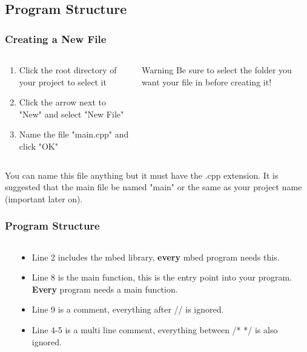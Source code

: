 \subsection{Program Structure}
\label{sub:program_structure}
\begin{frame}
	\frametitle{Creating a New File}
	\begin{columns}[c]
		\begin{column}{0.5\textwidth}
			\begin{enumerate}
				\item Click the root directory of your project to select it
				\item Click the arrow next to "New" and select "New File"
				\item Name the file "main.cpp" and click "OK"
			\end{enumerate}
		\end{column}
		\begin{column}{0.5\textwidth}
			\begin{block}{Warning}
				Be sure to select the folder you want your file in before creating it!
			\end{block}
		\end{column}
	\end{columns}
	\begin{center}
		You can name this file anything but it must have the .cpp extension.
		It is suggested that the main file be named "main" or the same as your project name (important later on).
	\end{center}
\end{frame}

\begin{frame}
	\frametitle{Program Structure}
	\begin{columns}[c]
		\begin{column}{0.45\textwidth}
			
		\end{column}
		\begin{column}{0.55\textwidth}
			\begin{itemize}
				\item Line 2 includes the mbed library, \textbf{every} mbed program needs this.
				\item Line 8 is the main function, this is the entry point into your program.
					\textbf{Every} program needs a main function.
				\item Line 9 is a comment, everything after // is ignored.
				 \item Line 4-5 is a multi line comment, everything between /* */ is also ignored.
			\end{itemize}
		\end{column}
	\end{columns}
\end{frame}

